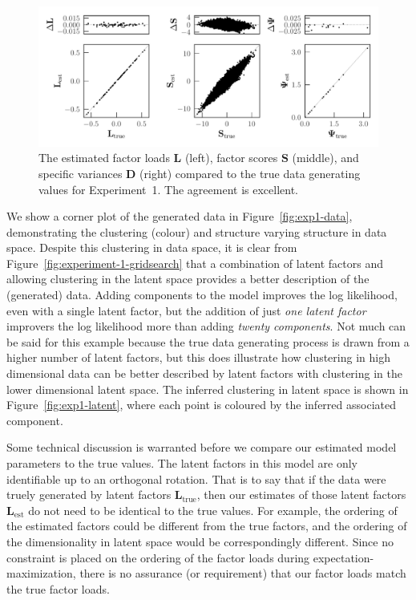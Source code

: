 \documentclass[twocolumn]{aastex62}
\newcommand{\vect}[1]{\boldsymbol{\mathbf{#1}}}
\renewcommand{\vec}[1]{\vect{#1}}
\newcommand{\factorloads}{\textbf{L}}
\newcommand{\factorscores}{\textbf{S}}
\newcommand{\specificvariance}{\vec{D}}
\begin{document}
\begin{figure}
	\includegraphics[width=\textwidth]{experiments/exp1-compare-all.pdf}
    \caption{The estimated factor loads $\factorloads$ (left), factor scores $\factorscores$ (middle),
    		 and specific variances $\specificvariance$ (right) compared to the 
		 	 true data generating values
		 	 for Experiment~1. The agreement is excellent.}
    \label{fig:exp1-compare}
\end{figure}


We show a corner plot of the generated data in Figure~\ref{fig:exp1-data},
demonstrating the clustering (colour) and structure varying structure in data space.
Despite this clustering in data space, it is clear from Figure~\ref{fig:experiment-1-gridsearch} that a combination of latent factors
and allowing clustering in the latent space provides a better description of the (generated) data.
Adding components to the model improves the log likelihood, even with a single latent factor,
but the addition of just \emph{one latent factor} improvers the log likelihood more than adding
\emph{twenty components}. Not much can be said for this example because the true data generating process 
is drawn from a higher number of latent factors, but this does illustrate how 
clustering in high dimensional data can be better described by latent factors with 
clustering in the lower dimensional latent space.
The inferred clustering in latent space is shown in Figure~\ref{fig:exp1-latent},
where each point is coloured by the inferred associated component. 




Some technical discussion is warranted before we compare our estimated model
parameters to the true values. The latent factors in this model are only
identifiable up to an orthogonal rotation. That is to say that
if the data were truely generated by latent factors $\factorloads_\textrm{true}$,
then our estimates of those latent factors $\factorloads_\textrm{est}$ do not need
to be identical to the true values. For example, the ordering of the estimated factors
could be different from the true factors, and the ordering of the dimensionality
in latent space would be correspondingly different. Since no constraint is
placed on the ordering of the factor loads during expectation-maximization,
there is no assurance (or requirement) that our factor loads match the true factor loads.
\end{document}
